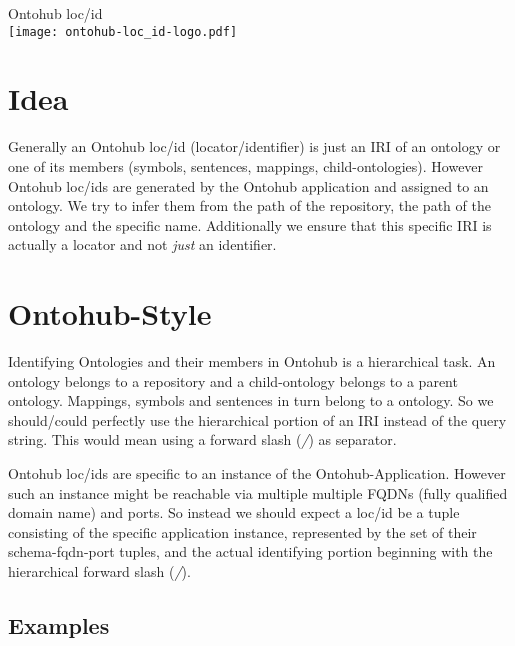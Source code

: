 \documentclass[a4paper,11pt,DIV=25]{scrartcl}
\author{Tim Reddehase}
\date{2014-09-13}
\begin{document}
\Huge
\begin{center}
  Ontohub loc/id\\
  \bigskip
  \texttt{[image: ontohub-loc\_id-logo.pdf]}
\end{center}
\normalsize

\bigskip

\section{Idea}

Generally an Ontohub loc/id (locator/identifier) is just an IRI of an ontology
or one of its members (symbols, sentences, mappings, child-ontologies). However
Ontohub loc/ids are generated by the Ontohub application and assigned to an
ontology.  We try to infer them from the path of the repository, the path of
the ontology and the specific name. Additionally we ensure that this specific
IRI is actually a locator and not \textit{just} an identifier.

\section{Ontohub-Style}

Identifying Ontologies and their members in Ontohub is a hierarchical task. An
ontology belongs to a repository and a child-ontology belongs to a parent
ontology. Mappings, symbols and sentences in turn belong to a ontology. So we
should/could perfectly use the hierarchical portion of an IRI instead of the
query string. This would mean using a forward slash (\textit{/}) as separator.

Ontohub loc/ids are specific to an instance of the Ontohub-Application. However
such an instance might be reachable via multiple multiple FQDNs (fully
qualified domain name) and ports. So instead we should expect a loc/id be a
tuple consisting of the specific application instance, represented by the set
of their schema-fqdn-port tuples, and the actual identifying portion
beginning with the hierarchical forward slash (\textit{/}).

\subsection{Examples}
\end{document}
